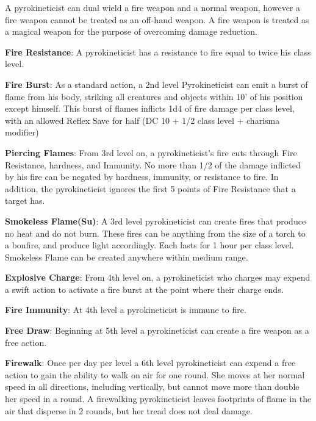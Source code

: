 A pyrokineticist can dual wield a fire weapon and a normal weapon, however a fire weapon cannot be treated as an off-hand weapon. A fire weapon is treated as a magical weapon for the purpose of overcoming damage reduction.

\textbf{Fire Resistance}: A pyrokineticist has a resistance to fire equal to twice his class level.

\textbf{Fire Burst}: As a standard action, a 2nd level Pyrokineticist can emit a burst of flame from his body, striking all creatures and objects within 10’ of his position except himself. This burst of flames inflicts 1d4 of fire damage per class level, with an allowed Reflex Save for half (DC 10 + 1/2 class level + charisma modifier)

\textbf{Piercing Flames}: From 3rd level on, a pyrokineticist’s fire cuts through Fire Resistance, hardness, and Immunity. No more than 1/2 of the damage inflicted by his fire can be negated by hardness, immunity, or resistance to fire. In addition, the pyrokineticist ignores the first 5 points of Fire Resistance that a target has.

\textbf{Smokeless Flame(Su)}: A 3rd level pyrokineticist can create fires that produce no heat and do not burn. These fires can be anything from the size of a torch to a bonfire, and produce light accordingly. Each lasts for 1 hour per class level. Smokeless Flame can be created anywhere within medium range.

\textbf{Explosive Charge}: From 4th level on, a pyrokineticist who charges may expend a swift action to activate a fire burst at the point where their charge ends.

\textbf{Fire Immunity}: At 4th level a pyrokineticist is immune to fire.

\textbf{Free Draw}: Beginning at 5th level a pyrokineticist can create a fire weapon as a free action.

\textbf{Firewalk}: Once per day per level a 6th level pyrokineticist can expend a free action to gain the ability to walk on air for one round. She moves at her normal speed in all directions, including vertically, but cannot move more than double her speed in a round. A firewalking pyrokineticist leaves footprints of flame in the air that disperse in 2 rounds, but her tread does not deal damage.